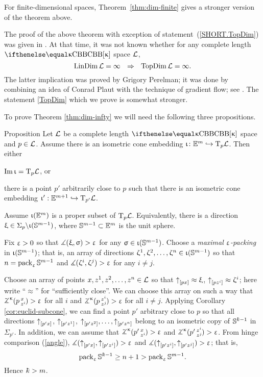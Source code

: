 For finite-dimensional spaces, Theorem~\ref{thm:dim-finite} gives a stronger version 
of the theorem above.

The proof of the above theorem with exception of  statement~(\ref{SHORT.TopDim}) was given in \cite{plaut:dimension}.
At that time, it was not known whether for any complete length $\Alex\kappa$ space $\mathcal{L}$,
\[\LinDim\spc{L}=\infty\ \ \Rightarrow\ \ \TopDim\spc{L}=\infty.\]
The latter implication was proved by Grigory Perelman;
it was done by combining an idea of Conrad Plaut with the technique of gradient flow; see \cite{perelman-petrunin:qg}.
The statement \ref{TopDim} which we prove is somewhat stronger.


To prove Theorem \ref{thm:dim-infty}  we will need the following three propositions.


\begin{thm}{Proposition}\label{E=T}
Let $\mathcal{L}$ be a complete length $\Alex{\kappa}$ space and $p\in \spc{L}$.
Assume there is an isometric cone embedding $\iota\:\EE^{m}\hookrightarrow \T_p\spc{L}$.  Then either
\begin{subthm}{}
 $\mathop{\rm Im}\nolimits\upiota=\text{\rm T}_p\mathcal{L}$, or
\end{subthm}

\begin{subthm}{} there is a point $p'$ arbitrarily close to $p$ such that there is an isometric cone embedding $\iota':\EE^{m+1}\hookrightarrow \T_{p'}\spc{L}$.
\end{subthm}
\end{thm}


Assume $\upiota(\mathbb{E}^{m})$ is a proper subset of $\text{\rm T}_p\mathcal{L}$.
Equivalently, there is a direction $\xi \in \Sigma_p\backslash\iota(\SS^{m-1})$,
where $\SS^{m-1}\subset \EE^m$ is the unit sphere. 

Fix $\upvarepsilon>0$ so that $\measuredangle(\upxi,\upsigma)>\upvarepsilon$ for any $\sigma\in \iota(\SS^{m-1})$. 
Choose a \emph{maximal $\upvarepsilon$-packing} in $\upiota(\mathbb{S}^{m-1})$;
that is, an array of directions $\zeta^1,\zeta^2,\dots,\zeta^n\in \iota(\SS^{m-1})$ so that $n=\mathop{\rm pack}\nolimits_\upvarepsilon \mathbb{S}^{m-1}$ and $\measuredangle(\upzeta^i,\upzeta^j)>\upvarepsilon$ for any $i\not=j$.

Choose an array of points $x,z^1,z^2,\dots,z^n\in\spc{L}$ so that
$\dir p x\approx\xi$, $\dir p{z^i}\approx\zeta^i$;
here write ``$\approx$'' for ``sufficiently close''.
We can choose this array on such a way that 
$\angk{\kappa}p x{z^i}>\eps$ for all $i$ 
and $\angk{\kappa}p{z^i}{z^j}>\eps$ for all $i\not=j$.
Applying Corollary \ref{cor:euclid-subcone}, we can find a point $p'$ arbitrary close to  $p$ 
so that all directions ${\uparrow}_{[{p'}{x}]}$, ${\uparrow}_{[{p'}{z^1}]}$, $\dir{p'}{z^2},\dots,\dir{p'}{z^n}$
belong to an isometric copy of $\SS^{\kay-1}$ in $\Sigma_{p'}$.
In addition, we can assume that $\angk{\kappa}{p'}x{z^i}>\eps$ and $\angk{\kappa}{p'}{z^i}{z^j}>\eps$.
From hinge comparison (\ref{angle}),
$\measuredangle({\uparrow}_{[{p'}{x}]},{\uparrow}_{[{p'}{z^i}]})>\upvarepsilon$ 
and $\measuredangle({\uparrow}_{[{p'}{z^i}]},{\uparrow}_{[{p'}{z^j}]})>\upvarepsilon$;
that is, 
\[\pack_\eps \SS^{\kay-1}\ge n+1>\pack_\eps \SS^{m-1}.\] 
Hence $\kay>m$.
\qeds


